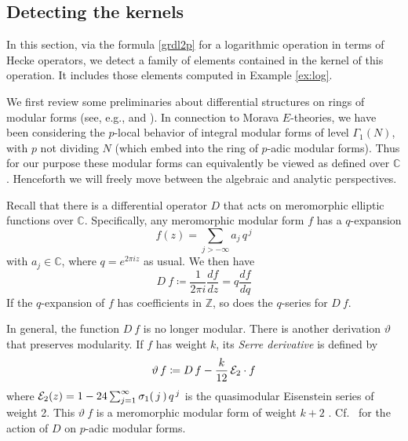 \documentclass{gtpart}
\theoremstyle{definition}
\theoremstyle{remark}
\newcommand{\mb}[1]{\mathbb{#1}}
\newcommand{\CE}{{\cal E}}
\newcommand{\BC}{{\mb C}}
\newcommand{\BZ}{{\mb Z}}
\newcommand{\G}{\Gamma}
\newcommand{\si}{\sigma}
\newcommand{\ce}{\coloneqq}
\renewcommand{\=}{\approx}
\renewcommand{\-}{\sim}
\numberwithin{equation}{section}
\begin{document}
\subsection{Detecting the kernels}
\label{subsec:thm}

In this section, via the formula \eqref{grdl2p} for a logarithmic operation in 
terms of Hecke operators, we detect a family of elements contained in the kernel 
of this operation.  It includes those elements computed in Example \ref{ex:log}.  

We first review some preliminaries about differential structures on rings of 
modular forms (see, e.g., \cite[\S 5]{1-2-3} and \cite[Section 2.3]{web}).  In 
connection to Morava $E$-theories, we have been considering the $p$-local 
behavior of integral modular forms of level $\G_1(N)$, with $p$ not dividing $N$ 
(which embed into the ring of $p$-adic modular forms).  Thus for our purpose 
these modular forms can equivalently be viewed as defined over $\BC$.  
Henceforth we will freely move between the algebraic and analytic perspectives.  

Recall that there is a differential operator $D$ that acts on meromorphic 
elliptic functions over $\BC$.  Specifically, any meromorphic modular form $f$ 
has a $q$-expansion 
\[
 f(z) = \sum_{j > -\infty} a_j \, q^{\,j} 
\]
with $a_j \in \BC$, where $q = e^{2 \pi i z}$ as usual.  We then have 
\begin{equation}
 \label{ramanujan}
 D ~\! f \ce \frac{1}{2 \pi i} \frac{df}{dz} = q \frac{df}{dq} 
\end{equation}
If the $q$-expansion of $f$ has coefficients in $\BZ$, so does the $q$-series 
for $D ~\! f$.  

In general, the function $D ~\! f$ is no longer modular.  There is another 
derivation $\vartheta$ that preserves modularity.  If $f$ has weight $k$, its 
{\em Serre derivative} is defined by 
\begin{equation}
 \label{serre}
 \vartheta ~\! f \ce D ~\! f - \frac{k}{12} \, \CE_2 \cdot f 
\end{equation}
where $\CE_2(z) = 1 - 24 \sum_{j = 1}^\infty \si_1(\,j\,) \, q^{\,j}$ is the 
quasimodular Eisenstein series of weight 2.  This $\vartheta ~\! f$ is a 
meromorphic modular form of weight $k + 2$ \cite[Proposition 2.11]{web}.  
Cf.~\cite[Th\'eor\`eme 5(a)]{fmpadiq} for the action of $D$ on $p$-adic modular 
forms.  
\end{document}
